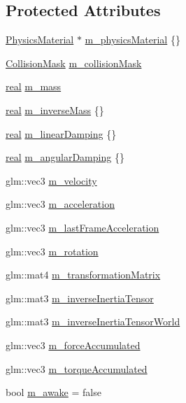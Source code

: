 \subsection*{Protected Attributes}
\begin{DoxyCompactItemize}
\item 
\mbox{\hyperlink{classr3_1_1_physics_material}{Physics\+Material}} $\ast$ \mbox{\hyperlink{classr3_1_1_rigid_body_a49766d24aef2bf1db8081fdac50c7924}{m\+\_\+physics\+Material}} \{\}
\item 
\mbox{\hyperlink{structr3_1_1_collision_mask}{Collision\+Mask}} \mbox{\hyperlink{classr3_1_1_rigid_body_a9ce3f6c2a0f158d9df5910c3697ebf7f}{m\+\_\+collision\+Mask}}
\item 
\mbox{\hyperlink{namespacer3_ab2016b3e3f743fb735afce242f0dc1eb}{real}} \mbox{\hyperlink{classr3_1_1_rigid_body_a9ecbd510187cfaaee3154d11f3bd782b}{m\+\_\+mass}}
\item 
\mbox{\hyperlink{namespacer3_ab2016b3e3f743fb735afce242f0dc1eb}{real}} \mbox{\hyperlink{classr3_1_1_rigid_body_a57f0423607e2ce9738a2fa796a443e5f}{m\+\_\+inverse\+Mass}} \{\}
\item 
\mbox{\hyperlink{namespacer3_ab2016b3e3f743fb735afce242f0dc1eb}{real}} \mbox{\hyperlink{classr3_1_1_rigid_body_aa7ae14fd779acb22a7c50aab88d1cb75}{m\+\_\+linear\+Damping}} \{\}
\item 
\mbox{\hyperlink{namespacer3_ab2016b3e3f743fb735afce242f0dc1eb}{real}} \mbox{\hyperlink{classr3_1_1_rigid_body_a3d9cfac391d02a657401f5e633361fe9}{m\+\_\+angular\+Damping}} \{\}
\item 
glm\+::vec3 \mbox{\hyperlink{classr3_1_1_rigid_body_a2de7cddcf262009fc8261688d1e56c49}{m\+\_\+velocity}}
\item 
glm\+::vec3 \mbox{\hyperlink{classr3_1_1_rigid_body_a3be64b2b09846d33ccdd9e276db020b9}{m\+\_\+acceleration}}
\item 
glm\+::vec3 \mbox{\hyperlink{classr3_1_1_rigid_body_aafe21461c488f0dffbbb2bd0c32f4585}{m\+\_\+last\+Frame\+Acceleration}}
\item 
glm\+::vec3 \mbox{\hyperlink{classr3_1_1_rigid_body_ad2b79563010507bc1ab9d34a47e48bfc}{m\+\_\+rotation}}
\item 
glm\+::mat4 \mbox{\hyperlink{classr3_1_1_rigid_body_ab973e24d84aedb3188aa04fcd2817228}{m\+\_\+transformation\+Matrix}}
\item 
glm\+::mat3 \mbox{\hyperlink{classr3_1_1_rigid_body_ac0a016d0e9d03e5365dd082eddb171fe}{m\+\_\+inverse\+Inertia\+Tensor}}
\item 
glm\+::mat3 \mbox{\hyperlink{classr3_1_1_rigid_body_a48c87824d37104f44cd190e7ff1159a9}{m\+\_\+inverse\+Inertia\+Tensor\+World}}
\item 
glm\+::vec3 \mbox{\hyperlink{classr3_1_1_rigid_body_a7d7ce53ed37502e4314766da7679b4cc}{m\+\_\+force\+Accumulated}}
\item 
glm\+::vec3 \mbox{\hyperlink{classr3_1_1_rigid_body_a51d3583c700e3bf071fce532a960bb98}{m\+\_\+torque\+Accumulated}}
\item 
bool \mbox{\hyperlink{classr3_1_1_rigid_body_abfcca5ae4caa68d23ba68cc4fd1d2d33}{m\+\_\+awake}} = false
\end{DoxyCompactItemize}
